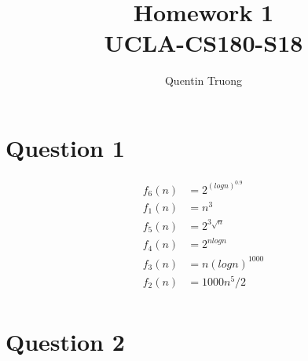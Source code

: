 \documentclass[11pt, oneside]{article}
\title{Homework 1\\UCLA-CS180-S18}
\author{Quentin Truong}
\begin{document}
\maketitle
{}


\section{Question 1}

\begin{align*}
f_6(n) &= 2^{(logn)^{0.9}} \\
f_1(n) &= n^3 \\
f_5(n) &= 2^{3\sqrt{n}} \\ 
f_4(n) &= 2^{nlogn} \\
f_3(n) &= n(logn)^{1000}\\
f_2(n) &= 1000n^5/2 \\
\end{align*}

\clearpage

\section{Question 2}
\end{document}
